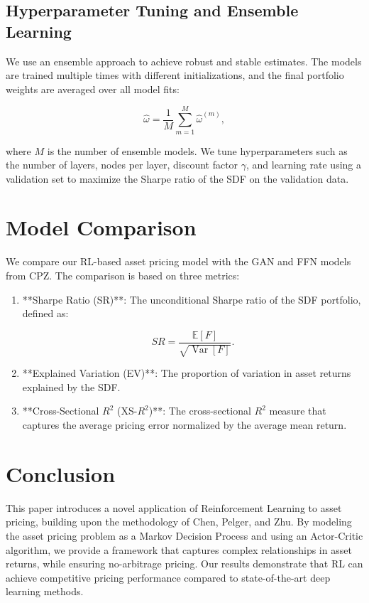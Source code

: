 \subsection{Hyperparameter Tuning and Ensemble Learning}
We use an ensemble approach to achieve robust and stable estimates. The models are trained multiple times with different initializations, and the final portfolio weights are averaged over all model fits:

\begin{equation}
    \hat{\omega} = \frac{1}{M} \sum_{m=1}^M \hat{\omega}^{(m)},
\end{equation}

where $M$ is the number of ensemble models. We tune hyperparameters such as the number of layers, nodes per layer, discount factor $\gamma$, and learning rate using a validation set to maximize the Sharpe ratio of the SDF on the validation data.

\section{Model Comparison}
We compare our RL-based asset pricing model with the GAN and FFN models from CPZ. The comparison is based on three metrics:

\begin{enumerate}
    \item **Sharpe Ratio (SR)**: The unconditional Sharpe ratio of the SDF portfolio, defined as:
    
    \begin{equation}
        SR = \frac{\mathbb{E}[F]}{\sqrt{\operatorname{Var}[F]}}.
    \end{equation}
    
    \item **Explained Variation (EV)**: The proportion of variation in asset returns explained by the SDF.
    
    \item **Cross-Sectional $R^2$ (XS-$R^2$)**: The cross-sectional $R^2$ measure that captures the average pricing error normalized by the average mean return.
\end{enumerate}

\section{Conclusion}
This paper introduces a novel application of Reinforcement Learning to asset pricing, building upon the methodology of Chen, Pelger, and Zhu. By modeling the asset pricing problem as a Markov Decision Process and using an Actor-Critic algorithm, we provide a framework that captures complex relationships in asset returns, while ensuring no-arbitrage pricing. Our results demonstrate that RL can achieve competitive pricing performance compared to state-of-the-art deep learning methods.

